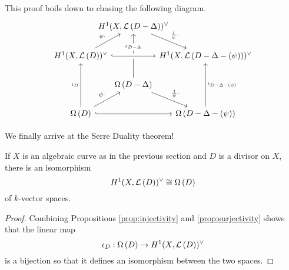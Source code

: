 \begin{cat}
  This proof boils down to chasing the following diagram.
  \[\begin{tikzcd}[column sep=-2em]
    & {\dual{D-\Delta}} \\
    {\dual{D}} && {\dual{D-\Delta-(\psi)}} \\
    & {\diffs{D-\Delta}} \\
    {\diffs{D}} && {\diffs{D-\Delta-(\psi)}}
    \arrow["\psi\cdot", from=2-1, to=1-2]
    \arrow["{\frac1{\psi}\cdot}", from=1-2, to=2-3]
    \arrow["\iota_D", from=4-1, to=2-1]
    \arrow["{\iota_{D-\Delta}}"{description, pos=0.7}, from=3-2, to=1-2]
    \arrow["\iota_{D-\Delta-(\psi)}"', from=4-3, to=2-3]
    \arrow[hook, crossing over, from=2-1, to=2-3]
    \arrow[hook, from=4-1, to=4-3]
    \arrow["\psi\cdot", from=4-1, to=3-2]
    \arrow["{\frac1{\psi}\cdot}", from=3-2, to=4-3]
  \end{tikzcd}\]
\end{cat}

We finally arrive at the Serre Duality theorem!
\begin{thm}\label{thm:serre}
  If $X$ is an algebraic curve as in the previous section
  and $D$ is a divisor on $X$, there is an isomorphism
  \[
    H^1(X,\mathcal{L}\left(D\right))^{\vee}\cong\Omega\left(D\right)
  \]
  of $k$-vector spaces.
\end{thm}
\begin{proof}
  Combining Propositions \ref{prop:injectivity} and \ref{prop:surjectivity}
  shows that the linear map
  \[\iota_{D}:\Omega\left(D\right)\to H^1(X,\mathcal{L}\left(D\right))^{\vee}\]
  is a bijection so that it defines an isomorphism between the two spaces.
\end{proof}
